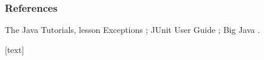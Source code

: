 \documentclass[aspectratio=169,10pt,compress]{beamer}
\begin{document}
\begin{frame}[t,fragile] \frametitle{References}
	\small The Java Tutorials, lesson Exceptions \cite{TheJavaTutorials}; JUnit User Guide \cite{homeJunit}; Big Java \cite{horstmann2016big}.

	\vspace{1em}
	[text]
	
	\tiny
\end{frame}




\begin{frame}[t,fragile]
	\begin{center}
		\vspace{4cm}
	\end{center}
\end{frame}
\end{document}
